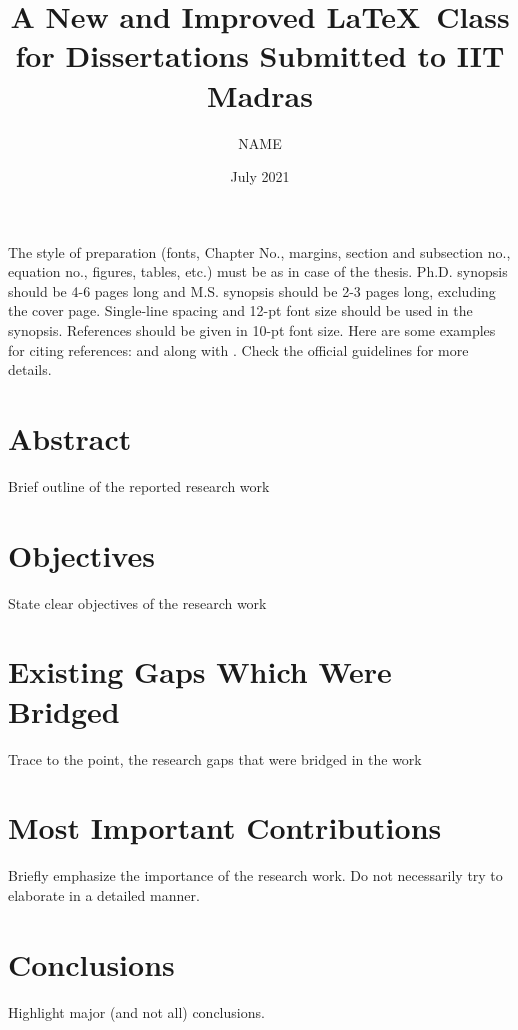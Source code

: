 \documentclass[PhD,synopsis,BlueTape]{iitmdiss}
\title{A New and Improved \LaTeX\ Class for Dissertations Submitted to IIT Madras}
\author{NAME}
\date{July 2021}
\begin{document}
\maketitle
\restoregeometry

\setcounter{page}{0}

\singlespacing

The style of preparation (fonts, Chapter No., margins, section and subsection no.,
equation no., figures, tables, etc.) must be as in case of the thesis. Ph.D. synopsis should be 4-6 pages long and M.S. synopsis should be 2-3 pages
long, excluding the cover page. Single-line spacing and 12-pt font size should be used in the synopsis. References should be given in 10-pt font size. Here are some examples for citing references: \cite{lamport:86} and \cite{Ahren2005} along with \cite{Roenby2016}. Check the official guidelines for more details.

\section{Abstract}
Brief outline of the reported research work

\section{Objectives}
State clear objectives of the research work

\section{Existing Gaps Which Were Bridged}
Trace to the point, the research gaps that were bridged in the work

\section{Most Important Contributions}
Briefly emphasize the importance of the research work. Do not necessarily try to elaborate in a detailed manner.

\section{Conclusions}
Highlight major (and not all) conclusions.
\end{document}
